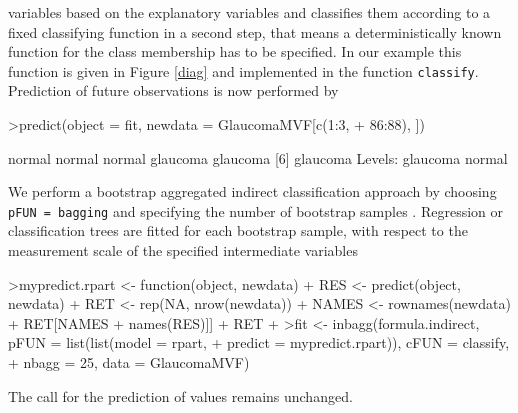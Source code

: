 \documentclass[11pt]{article}
\begin{document}
variables based on the explanatory variables and classifies them 
according to a fixed classifying function in a second step, that means 
a deterministically known function for the class membership has to be 
specified. In our example this function is given in 
Figure \ref{diag} and implemented in the function \texttt{classify}.\\
Prediction of future observations is now performed by
\begin{Schunk}
\begin{Sinput}
>predict(object = fit, newdata = GlaucomaMVF[c(1:3, 
+     86:88), ])
\end{Sinput}
\begin{Soutput}
[1] normal   normal   normal   glaucoma glaucoma
[6] glaucoma
Levels: glaucoma normal
\end{Soutput}
\end{Schunk}
We perform a bootstrap aggregated indirect classification approach by 
choosing \texttt{pFUN = bagging} and specifying the number of 
bootstrap samples \citep{ifcs:2001}. Regression or classification 
trees are fitted for each bootstrap sample, with respect to the 
measurement scale of the specified intermediate variables 
\begin{Schunk}
\begin{Sinput}
>mypredict.rpart <- function(object, newdata) {
+     RES <- predict(object, newdata)
+     RET <- rep(NA, nrow(newdata))
+     NAMES <- rownames(newdata)
+     RET[NAMES %in% names(RES)] <- RES[NAMES[NAMES %in% 
+         names(RES)]]
+     RET
+ }
>fit <- inbagg(formula.indirect, pFUN = list(list(model = rpart, 
+     predict = mypredict.rpart)), cFUN = classify, 
+     nbagg = 25, data = GlaucomaMVF)
\end{Sinput}
\end{Schunk}
The call for the prediction of values remains unchanged.
\end{document}
